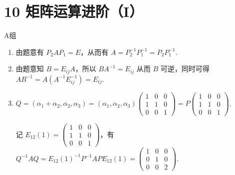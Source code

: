 \section*{10 矩阵运算进阶（I）}

\vspace{2ex}

\centerline{\heiti A组}
\begin{enumerate}
    \item 由题意有 $P_2AP_1 = E$，从而有 $A=P_2^{-1}P_1^{-1}=P_2P_1^{-1}$.

    \item 由题意知 $B = E_{ij}A$，所以 $BA^{-1}=E_{ij}$ 从而 $B$ 可逆，同时可得 $AB^{-1}=A(A^{-1}E_{ij}^{-1})=E_{ij}$.

    \item $Q = (\alpha_1+\alpha_2,\alpha_2,\alpha_3)=(\alpha_1,\alpha_2,\alpha_3)\begin{pmatrix}1 & 0 & 0 \\ 1 & 1 & 0 \\ 0 & 0 & 1\end{pmatrix}=P\begin{pmatrix}1 & 0 & 0 \\ 1 & 1 & 0 \\ 0 & 0 & 1\end{pmatrix}$.

          记 $E_{12}(1)=\begin{pmatrix}1 & 0 & 0 \\ 1 & 1 & 0 \\ 0 & 0 & 1\end{pmatrix}$，有 $Q^{-1}AQ=E_{12}(1)^{-1}P^{-1}APE_{12}(1)=\begin{pmatrix}1 & 0 & 0 \\ 0 & 1 & 0 \\ 0 & 0 & 2\end{pmatrix}$.


\end{enumerate}
